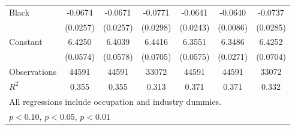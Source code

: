 {\begin{longtable}{l*{6}{c}}
Black               &     -0.0674\sym{***}&     -0.0671\sym{***}&     -0.0771\sym{***}&     -0.0641\sym{***}&     -0.0640\sym{***}&     -0.0737\sym{***}\\
                    &    (0.0257)         &    (0.0257)         &    (0.0298)         &    (0.0243)         &    (0.0086)         &    (0.0285)         \\
Constant            &      6.4250\sym{***}&      6.4039\sym{***}&      6.4416\sym{***}&      6.3551\sym{***}&      6.3486\sym{***}&      6.4252\sym{***}\\
                    &    (0.0574)         &    (0.0578)         &    (0.0705)         &    (0.0575)         &    (0.0271)         &    (0.0704)         \\
\hline  
Observations        &       44591         &       44591         &       33072         &       44591         &       44591         &       33072         \\
\(R^{2}\)           &       0.355         &       0.355         &       0.313         &       0.371         &       0.371         &       0.332         \\
\hline  
\multicolumn{7}{l}{\footnotesize All regressions include occupation and industry dummies.}\\
\multicolumn{7}{l}{\footnotesize \sym{*} \(p<0.10\), \sym{**} \(p<0.05\), \sym{***} \(p<0.01\)}\\
\end{longtable}
}
